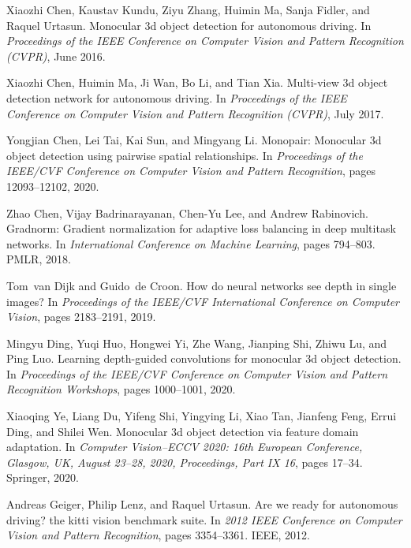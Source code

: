 \documentclass[10pt,twocolumn,letterpaper]{article}
\begin{document}
{\begin{thebibliography}{10}
Xiaozhi Chen, Kaustav Kundu, Ziyu Zhang, Huimin Ma, Sanja Fidler, and Raquel
  Urtasun.
\newblock Monocular 3d object detection for autonomous driving.
\newblock In {\em Proceedings of the IEEE Conference on Computer Vision and
  Pattern Recognition (CVPR)}, June 2016.

Xiaozhi Chen, Huimin Ma, Ji Wan, Bo Li, and Tian Xia.
\newblock Multi-view 3d object detection network for autonomous driving.
\newblock In {\em Proceedings of the IEEE Conference on Computer Vision and
  Pattern Recognition (CVPR)}, July 2017.

Yongjian Chen, Lei Tai, Kai Sun, and Mingyang Li.
\newblock Monopair: Monocular 3d object detection using pairwise spatial
  relationships.
\newblock In {\em Proceedings of the IEEE/CVF Conference on Computer Vision and
  Pattern Recognition}, pages 12093--12102, 2020.

Zhao Chen, Vijay Badrinarayanan, Chen-Yu Lee, and Andrew Rabinovich.
\newblock Gradnorm: Gradient normalization for adaptive loss balancing in deep
  multitask networks.
\newblock In {\em International Conference on Machine Learning}, pages
  794--803. PMLR, 2018.

Tom~van Dijk and Guido~de Croon.
\newblock How do neural networks see depth in single images?
\newblock In {\em Proceedings of the IEEE/CVF International Conference on
  Computer Vision}, pages 2183--2191, 2019.

Mingyu Ding, Yuqi Huo, Hongwei Yi, Zhe Wang, Jianping Shi, Zhiwu Lu, and Ping
  Luo.
\newblock Learning depth-guided convolutions for monocular 3d object detection.
\newblock In {\em Proceedings of the IEEE/CVF Conference on Computer Vision and
  Pattern Recognition Workshops}, pages 1000--1001, 2020.

Xiaoqing Ye, Liang Du, Yifeng Shi, Yingying Li, Xiao Tan, Jianfeng Feng, Errui
  Ding, and Shilei Wen.
\newblock Monocular 3d object detection via feature domain adaptation.
\newblock In {\em Computer Vision--ECCV 2020: 16th European Conference,
  Glasgow, UK, August 23--28, 2020, Proceedings, Part IX 16}, pages 17--34.
  Springer, 2020.

Andreas Geiger, Philip Lenz, and Raquel Urtasun.
\newblock Are we ready for autonomous driving? the kitti vision benchmark
  suite.
\newblock In {\em 2012 IEEE Conference on Computer Vision and Pattern
  Recognition}, pages 3354--3361. IEEE, 2012.


\end{thebibliography}}
\end{document}
